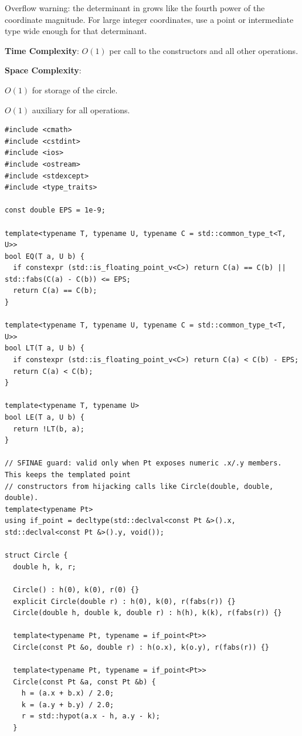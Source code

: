 Overflow warning: the determinant in  grows like the fourth power of the coordinate magnitude. For large integer coordinates, use a point or intermediate type wide enough for that determinant.

\textbf{Time Complexity}: $O(1)$ per call to the constructors and all other operations.

\textbf{Space Complexity}:
\begin{compactitem}
  \item $O(1)$ for storage of the circle.
  \item $O(1)$ auxiliary for all operations.
\end{compactitem}

\begin{lstlisting}[style=cpp]
#include <cmath>
#include <cstdint>
#include <ios>
#include <ostream>
#include <stdexcept>
#include <type_traits>

const double EPS = 1e-9;

template<typename T, typename U, typename C = std::common_type_t<T, U>>
bool EQ(T a, U b) {
  if constexpr (std::is_floating_point_v<C>) return C(a) == C(b) || std::fabs(C(a) - C(b)) <= EPS;
  return C(a) == C(b);
}

template<typename T, typename U, typename C = std::common_type_t<T, U>>
bool LT(T a, U b) {
  if constexpr (std::is_floating_point_v<C>) return C(a) < C(b) - EPS;
  return C(a) < C(b);
}

template<typename T, typename U>
bool LE(T a, U b) {
  return !LT(b, a);
}

// SFINAE guard: valid only when Pt exposes numeric .x/.y members. This keeps the templated point
// constructors from hijacking calls like Circle(double, double, double).
template<typename Pt>
using if_point = decltype(std::declval<const Pt &>().x, std::declval<const Pt &>().y, void());

struct Circle {
  double h, k, r;

  Circle() : h(0), k(0), r(0) {}
  explicit Circle(double r) : h(0), k(0), r(fabs(r)) {}
  Circle(double h, double k, double r) : h(h), k(k), r(fabs(r)) {}

  template<typename Pt, typename = if_point<Pt>>
  Circle(const Pt &o, double r) : h(o.x), k(o.y), r(fabs(r)) {}

  template<typename Pt, typename = if_point<Pt>>
  Circle(const Pt &a, const Pt &b) {
    h = (a.x + b.x) / 2.0;
    k = (a.y + b.y) / 2.0;
    r = std::hypot(a.x - h, a.y - k);
  }


\end{lstlisting}
